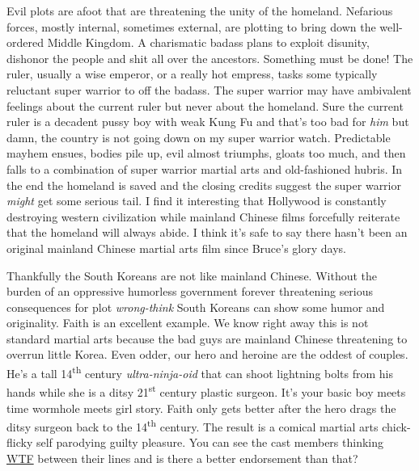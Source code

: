 Evil plots are afoot that are threatening the unity of the homeland.
Nefarious forces, mostly internal, sometimes external, are plotting to
bring down the well-ordered Middle Kingdom. A charismatic badass plans
to exploit disunity, dishonor the people and shit all over the
ancestors. Something must be done! The ruler, usually a wise emperor, or
a really hot empress, tasks some typically reluctant super warrior to
off the badass. The super warrior may have ambivalent feelings about the
current ruler but never about the homeland. Sure the current ruler is a
decadent pussy boy with weak Kung Fu and that's too bad for \emph{him}
but damn, the country is not going down on my super warrior watch.
Predictable mayhem ensues, bodies pile up, evil almost triumphs, gloats
too much, and then falls to a combination of super warrior martial arts
and old-fashioned hubris. In the end the homeland is saved and the
closing credits suggest the super warrior \emph{might} get some serious
tail. I find it interesting that Hollywood is constantly destroying
western civilization while mainland Chinese films forcefully reiterate
that the homeland will always abide. I think it's safe to say there
hasn't been an original mainland Chinese martial arts film since Bruce's
glory days.

Thankfully the South Koreans are not like mainland Chinese. Without the
burden of an oppressive humorless government forever threatening serious
consequences for plot \emph{wrong-think} South Koreans can show some
humor and originality. Faith is an excellent example. We know right away
this is not standard martial arts because the bad guys are mainland
Chinese threatening to overrun little Korea. Even odder, our hero and
heroine are the oddest of couples. He's a tall 14\textsuperscript{th}
century \emph{ultra-ninja-oid} that can shoot lightning bolts from his
hands while she is a ditsy 21\textsuperscript{st} century plastic
surgeon. It's your basic boy meets time wormhole meets girl story. Faith
only gets better after the hero drags the ditsy surgeon back to the
14\textsuperscript{th} century. The result is a comical martial arts
chick-flicky self parodying guilty pleasure. You can see the cast
members thinking
\href{http://www.urbandictionary.com/define.php?term=wtf}{WTF} between
their lines and is there a better endorsement than that?





%